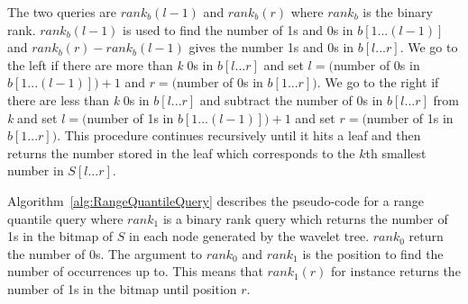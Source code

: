 The two queries are $rank_b(l-1)$ and $rank_b(r)$ where $rank_b$ is the binary rank.
$rank_b(l-1)$ is used to find the number of 1s and 0s in $b[1...(l-1)]$ and $rank_b(r) - rank_b(l-1)$ gives the number 1s and 0s in $b[l...r]$. 
We go to the left if there are more than \textit{k} 0s in $b[l...r]$ and set $l = ($number of 0s in $b[1...(l-1)])+1$ and $r=($number of 0s in $b[1...r])$. 
We go to the right if there are less than \textit{k} 0s in $b[l...r]$ and subtract the number of 0s in $b[l...r]$ from \textit{k} and set $l = ($number of 1s in $b[1...(l-1)])+1$ and set $r=($number of 1s in $b[1...r])$. 
This procedure continues recursively until it hits a leaf and then returns the number stored in the leaf which corresponds to the $k$th smallest number in $S[l...r]$.

Algorithm~\ref{alg:RangeQuantileQuery} describes the pseudo-code for a range quantile query where $rank_1$ is a binary rank query which returns the number of 1s in the bitmap of $S$ in each node generated by the wavelet tree. 
$rank_0$ return the number of 0s.
The argument to $rank_0$ and $rank_1$ is the position to find the number of occurrences up to.
This means that $rank_1(r)$ for instance returns the number of 1s in the bitmap until position $r$.

